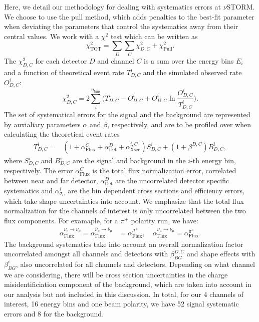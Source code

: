 Here, we detail our methodology for dealing with systematics errors at $\nu$STORM. We choose to use the pull method, which adds penalties to the best-fit parameter when deviating the parameters that control the systematics away from their central values. We work with a $\chi^2$ test which can be written as
%
\begin{equation}
\chi^2 _{\text{TOT}} = \sum_{D} \sum_{C} \chi^2_{D, C} + \chi^2_{\text{Pull}}.
\end{equation}
%
The $\chi^2_{D, C}$ for each detector $D$ and channel $C$ is a sum over the energy bins $E_i$ and a function of theoretical event rate $T^i_{D, C}$ and the simulated observed rate $O^i_{D, C}$:
%
\begin{equation}
\chi^2_{D, C} = 2 \sum_{i}^{n_{\text{bins}}} \Big(T^i_{D, C} - O^i_{D, C} + O^i_{D, C} \ln{\frac{O^i_{D, C}}{T^i_{D, C}}}\Big).
\end{equation}
%
The set of systematical errors for the signal and the background are represented by auxialiary parameters $\alpha$ and $\beta$, respectively, and are to be profiled over when calculating the theoretical event rates
%
\begin{align}
T^i_{D, C} =& (1 + \alpha_{\text{Flux}}^C + \alpha_{\text{Det}}^D + \alpha_{\text{Xsec}}^{i, C}) S^i_{D, C} + (1 + \beta^{D,C}) B^i_{D, C},
\end{align}
%
where $S^i_{D, C}$ and $B^i_{D, C}$ are the signal and background in the $i$-th energy bin, respectively. The error $\alpha_{\text{Flux}}^C$ is the total flux normalization error, correlated between near and far detector,  $\alpha_{\text{Det}}^D$ are the uncorrelated detector specific systematics and $\alpha_{\sigma_C}^i$ are the bin dependent cross sections and efficiency errors, which take shape uncertainties into account. We emphasize that the total flux normalization for the channels of interest is only uncorrelated between the two flux components. For examaple, for a $\pi^+$ polarity run, we have:
%
\begin{eqnarray}
\alpha_{\text{Flux}}^{\nu_{e} \to \nu_{\mu}} = \alpha_{\text{Flux}}^{\overline{\nu}_{\mu} \to \overline{\nu}_{\mu}} & =  \alpha_{\text{Flux}}^{\mu^+}, \quad  \alpha_{\text{Flux}}^{\nu_{\mu} \to \nu_{\mu}}  =  \alpha_{\text{Flux}}^{\pi^+}.
\end{eqnarray}
%
The background systematics take into account an overall normalization factor uncorrelated amongst all channels and detectors with $\beta_{BG}^{D,C}$ and shape effects with $\beta_{BG}^{i}$, also uncorrelated for all channels and detectors. Depending on what channel we are considering, there will be cross section uncertainties in the charge misidentificiation component of the background, which are taken into account in our analysis but not included in this discussion. In total, for our 4 channels of interest, 16 energy bins and one beam polarity, we have 52 signal systematic errors and 8 for the background.

